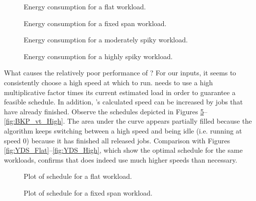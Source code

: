 \documentclass[11pt]{article}
\begin{document}
\begin{figure}
\centering
{}
\caption{Energy consumption for a flat workload.}
\label{fig:energy-flat}
\end{figure}

\begin{figure}
\centering
{}
\caption{Energy consumption for a fixed span workload.}
\label{fig:energy-fixed}
\end{figure}

\begin{figure}
\centering
{}
\caption{Energy consumption for a moderately spiky workload.}
\label{fig:energy-moderate}
\end{figure}

\begin{figure}
\centering
{}
\caption{Energy consumption for a highly spiky workload.}
\label{fig:energy-high}
\end{figure}



What causes the relatively poor performance of ?
For our inputs, it seems to consistently choose a high speed at
which to run.  needs to use a 
high multiplicative factor  times its current estimated load in order to guarantee a feasible schedule.
In addition, 's calculated speed can be increased by
jobs that have already finished.
Observe the  schedules depicted in Figures \ref{fig:BKP_vt_Flat}--\ref{fig:BKP_vt_High}.
The area under the curve appears partially filled because the
algorithm keeps switching between a high speed and being idle
(i.e. running at speed 0) because it has finished all released jobs.
Comparison with Figures \ref{fig:YDS_Flat}--\ref{fig:YDS_High}, which
show the optimal schedule for the same workloads, confirms that 
does indeed use much higher speeds than necessary.

\begin{figure}
\centering
{}
\caption{Plot of   schedule for a flat workload.}
\label{fig:BKP_vt_Flat}
\end{figure}

\begin{figure}
\centering
{}
\caption{Plot of   schedule for a fixed span workload.}
\label{fig:BKP_vt_Fixed}
\end{figure}
\end{document}

